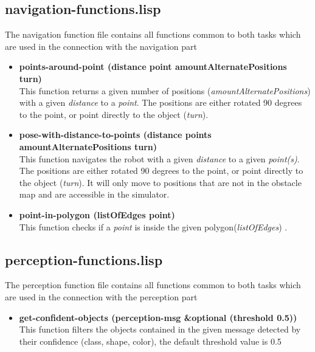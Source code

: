 \documentclass[main.tex]{subfiles}
\begin{document}
	    \subsection{navigation-functions.lisp}
	    The navigation function file contains all functions common to both tasks which are used in the connection with the navigation part
	    \begin{itemize}
	    	\item \textbf{points-around-point (distance point amountAlternatePositions turn)} \\
	    	This function returns a given number of positions (\textit{amountAlternatePositions}) with a given \textit{distance} to a \textit{point}. The positions are either rotated 90 degrees to the point, or point directly to the object (\textit{turn}).
	    	\item \textbf{pose-with-distance-to-points (distance points amountAlternatePositions turn)} \\
	    	This function navigates the robot with a given \textit{distance} to a given \textit{point(s)}. The positions are either rotated 90 degrees to the point, or point directly to the object (\textit{turn}). It will only move to positions that are not in the obstacle map and are accessible in the simulator.
	    	\item \textbf{point-in-polygon (listOfEdges point)} \\
			This function checks if a \textit{point} is inside the given polygon(\textit{listOfEdges}) .
	    \end{itemize}
	    \subsection{perception-functions.lisp}
	    The perception function file contains all functions common to both tasks which are used in the connection with the perception part
	    \begin{itemize}
	    	\item \textbf{get-confident-objects (perception-msg \&optional (threshold 0.5))} \\
	    	This function filters the objects contained in the given message detected by their confidence (class, shape, color), the default threshold value is 0.5
	    \end{itemize}
\end{document}
